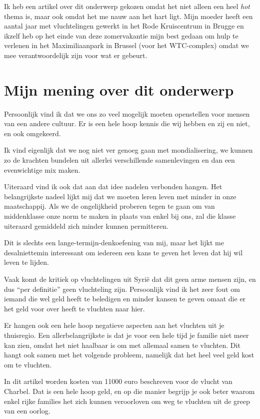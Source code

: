\documentclass[12pt, a4paper]{paper}
\begin{document}
Ik heb een artikel over dit onderwerp gekozen omdat het niet alleen een heel \emph{hot} thema is, maar ook omdat het me nauw aan het hart ligt. Mijn moeder heeft een aantal jaar met vluchtelingen gewerkt in het Rode Kruiscentrum in Brugge en ikzelf heb op het einde van deze zomervakantie mijn best gedaan om hulp te verlenen in het Maximiliaanpark in Brussel (voor het WTC-complex) omdat we mee verantwoordelijk zijn voor wat er gebeurt.


\section{Mijn mening over dit onderwerp}

Persoonlijk vind ik dat we ons zo veel mogelijk moeten openstellen voor mensen van een andere cultuur. Er is een hele hoop kennis die wij hebben en zij en niet, en ook omgekeerd.

Ik vind eigenlijk dat we nog niet ver genoeg gaan met mondialisering, we kunnen zo de krachten bundelen uit allerlei verschillende samenlevingen en dan een evenwichtige mix maken.

Uiteraard vind ik ook dat aan dat idee nadelen verbonden hangen. Het belangrijkste nadeel lijkt mij dat we moeten leren leven met minder in onze maatschappij. Als we de ongelijkheid proberen tegen te gaan om van middenklasse onze norm te maken in plaats van enkel bij ons, zal die klasse uiteraard gemiddeld zich minder kunnen permitteren.

Dit is slechts een lange-termijn-denkoefening van mij, maar het lijkt me desalniettemin interessant om iedereen een kans te geven het leven dat hij wil leven te lijden.

Vaak komt de kritiek op vluchtelingen uit Syrië dat dit geen arme mensen zijn, en dus ``per definitie'' geen vluchteling zijn. Persoonlijk vind ik het zeer fout om iemand die wel geld heeft te beledigen en minder kansen te geven omaat die er het geld voor over heeft te vluchten naar hier.

Er hangen ook een hele hoop negatieve aspecten aan het vluchten uit je thuisregio. Een allerbelangrijkste is dat je voor een hele tijd je familie niet meer kan zien, omdat het niet haalbaar is om met allemaal samen te vluchten. Dit hangt ook samen met het volgende probleem, namelijk dat het heel veel geld kost om te vluchten.

In dit artikel worden kosten van 11000 euro beschreven voor de vlucht van Charbel. Dat is een hele hoop geld, en op die manier begrijp je ook beter waarom enkel rijke families het zich kunnen veroorloven om weg te vluchten uit de greep van een oorlog.
\end{document}
